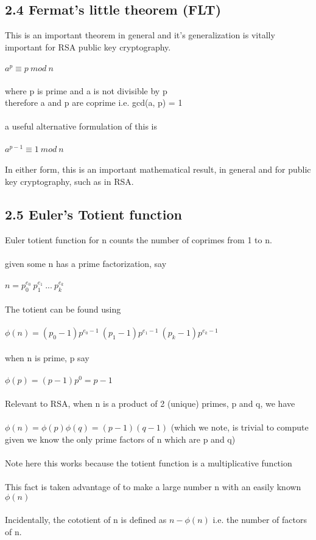 \documentclass[11pt]{article}   	%
\begin{document}
\subsection*{2.4 Fermat’s little theorem (FLT)}

This is an important theorem in general and it's generalization is vitally important for RSA public key cryptography.  \\
\\
\boldmath $ a^p \equiv p \ mod \ n $ \unboldmath \\
\\
where p is prime and a is not divisible by p \\
therefore a and p are coprime i.e. gcd(a, p) = 1 \\
\\
a useful alternative formulation of this is \\
\\
$ a^{p-1} \equiv 1 \ mod \ n $ \\
\\
In either form, this is an important mathematical result, in general and for public key cryptography, such as in RSA.


\subsection*{2.5 Euler's Totient function}

Euler totient function for n counts the number of coprimes from 1 to n. \\
\\
given some n has a prime factorization, say \\
\\
$ n = p_0^{e_0} \ p_1^{e_1} \ ... \ p_k^{e_k} $ \\
\\
The totient can be found using \\
\\
$ \phi(n) = (p_0 - 1)p^{e_0 - 1} \ (p_1 - 1)p^{e_1 - 1} \ (p_k - 1)p^{e_k - 1} $ \\
\\
when n is prime, p say \\
\\
$ \phi(p) = (p-1)p^0 = p - 1 $ \\
\\
Relevant to RSA, when n is a product of 2 (unique) primes, p and q, we have \\
\\
$ \phi(n) = \phi(p)\phi(q) = (p-1)(q-1) $ (which we note, is trivial to compute given we know the only prime factors of n which are p and q) \\
\\
Note here this works because the totient function is a multiplicative function \\
\\
This fact is taken advantage of to make a large number n with an easily known $ \phi(n) $ \\
\\
Incidentally, the cototient of n is defined as $ n - \phi(n) $ i.e. the number of factors of n.
\end{document}
